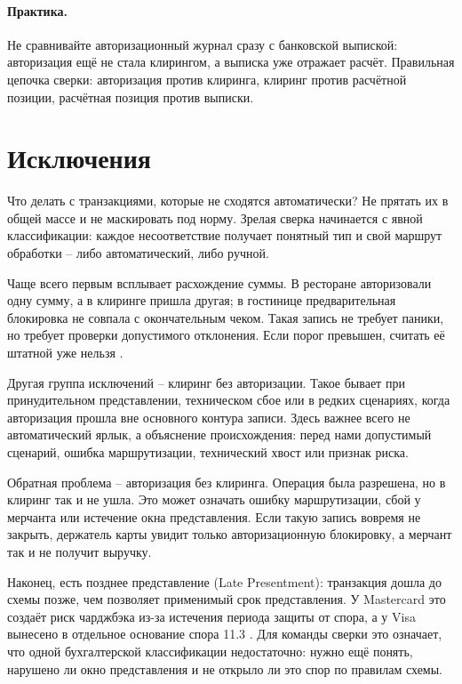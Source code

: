 \paragraph{Практика.}
Не сравнивайте авторизационный журнал сразу с банковской выпиской: авторизация ещё не стала клирингом, а выписка уже отражает расчёт. Правильная цепочка сверки: авторизация против клиринга, клиринг против расчётной позиции, расчётная позиция против выписки.


\section{Исключения}
\label{sec:recon-exceptions}

Что делать с транзакциями, которые не сходятся автоматически? Не
прятать их в общей массе и не маскировать под норму. Зрелая
сверка начинается с явной классификации: каждое несоответствие
получает понятный тип и свой маршрут обработки -- либо автоматический,
либо ручной.

Чаще всего первым всплывает расхождение суммы. В ресторане
авторизовали одну сумму, а в клиринге пришла другая; в гостинице
предварительная блокировка не совпала с окончательным чеком. Такая
запись не требует паники, но требует проверки допустимого отклонения.
Если порог превышен, считать её штатной уже нельзя \cite{visa-core-rules}.

Другая группа исключений -- клиринг без авторизации. Такое бывает при
принудительном представлении, техническом сбое или в редких сценариях,
когда авторизация прошла вне основного контура записи. Здесь важнее
всего не автоматический ярлык, а объяснение происхождения: перед нами
допустимый сценарий, ошибка маршрутизации, технический хвост или
признак риска.

Обратная проблема -- авторизация без клиринга. Операция была разрешена,
но в клиринг так и не ушла. Это может означать ошибку маршрутизации,
сбой у мерчанта или истечение окна представления. Если такую запись
вовремя не закрыть, держатель карты увидит только авторизационную
блокировку, а мерчант так и не получит выручку.

Наконец, есть позднее представление (Late Presentment): транзакция
дошла до схемы позже, чем позволяет применимый срок представления. У
Mastercard это создаёт риск чарджбэка из-за истечения периода защиты
от спора, а у Visa вынесено в отдельное основание спора 11.3
\cite{mc-tpr}\cite{visa-core-rules}. Для команды сверки это
означает, что одной бухгалтерской классификации недостаточно: нужно
ещё понять, нарушено ли окно представления и не открыло ли это спор по
правилам схемы.

